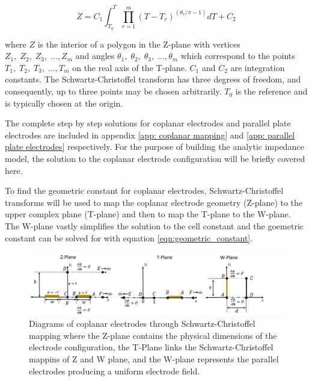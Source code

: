     \begin{equation}
        Z = C_1 \int_{T_0}^T \prod^m_{r=1} (T - T_r)^{(\theta_r/\pi - 1)} dT + C_2
    \end{equation}
    
    \noindent where $Z$ is the interior of a polygon in the Z-plane with vertices $Z_1,\;Z_2,\;Z_3,\; ...,Z_m$ and angles $\theta_1,\;\theta_2,\;\theta_3,\; ...,\theta_m$ which correspond to the points $T_1,\;T_2,\;T_3,\; ...,T_m$ on the real axis of the T-plane. $C_1$ and $C_2$ are integration constants. The Schwartz-Christoffel transform has three degrees of freedom, and consequently, up to three points may be chosen arbitrarily. $T_0$ is the reference and is typically chosen at the origin.
    
    \par The complete step by step solutions for coplanar electrodes and parallel plate electrodes are included in appendix \ref{app: coplanar mapping} and \ref{app: parallel plate electrodes} respectively. For the purpose of building the analytic impedance model, the solution to the coplanar electrode configuration will be briefly covered here. 
    
    \par To find the geometric constant for coplanar electrodes, Schwartz-Christoffel transforms will be used to map the coplanar electrode geometry (Z-plane) to the upper complex plane (T-plane) and then to map the T-plane to the W-plane. The W-plane vastly simplifies the solution to the cell constant and the goemetric constant can be solved for with equation \ref{eqn:geometric_constant}. 
  \begin{figure}[h]
        \centering
        \includegraphics[width=\textwidth]{images/scmPlanes.png}
        \caption[Diagrams of coplanar electrodes through Schwartz-Christoffel mapping]{Diagrams of coplanar electrodes through Schwartz-Christoffel mapping where the Z-plane contains the physical dimensions of the electrode configuration, the T-Plane links the Schwartz-Christoffel mappins of Z and W plane, and the W-plane represents the parallel electrodes producing a uniform electrode field.}
        \label{fig:scm_planes}
    \end{figure}

